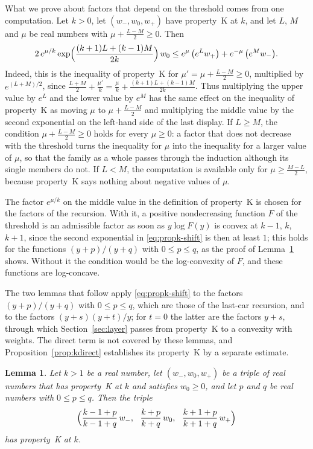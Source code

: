 \documentclass{amsart}
\newtheorem{lemma}[theorem]{Lemma}
\theoremstyle{definition}
\theoremstyle{remark}
\numberwithin{equation}{section}
\begin{document}
What we prove about factors that depend on the threshold comes from one computation. Let $k>0$, let $(w_-,w_0,w_+)$ have property~K at $k$, and let $L$, $M$ and $\mu$ be real numbers with $\mu+\frac{L-M}{2}\ge 0$. Then
\begin{equation}\label{eq:propk-shift}
2\,e^{\mu/k}\exp\Bigl(\frac{(k+1)L+(k-1)M}{2k}\Bigr)\,w_0\le e^{\mu}\,\bigl(e^{L}w_+\bigr)+e^{-\mu}\,\bigl(e^{M}w_-\bigr).
\end{equation}
Indeed, this is the inequality of property~K for $\mu'=\mu+\frac{L-M}{2}\ge 0$, multiplied by $e^{(L+M)/2}$, since $\frac{L+M}{2}+\frac{\mu'}{k}=\frac{\mu}{k}+\frac{(k+1)L+(k-1)M}{2k}$. Thus multiplying the upper value by $e^{L}$ and the lower value by $e^{M}$ has the same effect on the inequality of property~K as moving $\mu$ to $\mu+\frac{L-M}{2}$ and multiplying the middle value by the second exponential on the left-hand side of the last display. If $L\ge M$, the condition $\mu+\frac{L-M}{2}\ge 0$ holds for every $\mu\ge 0$: a factor that does not decrease with the threshold turns the inequality for $\mu$ into the inequality for a larger value of $\mu$, so that the family as a whole passes through the induction although its single members do not. If $L<M$, the computation is available only for $\mu\ge\frac{M-L}{2}$, because property~K says nothing about negative values of $\mu$.

The factor $e^{\mu/k}$ on the middle value in the definition of property~K is chosen for the factors of the recursion. With it, a positive nondecreasing function $F$ of the threshold is an admissible factor as soon as $y\log F(y)$ is convex at $k-1$, $k$, $k+1$, since the second exponential in \eqref{eq:propk-shift} is then at least $1$; this holds for the functions $(y+p)/(y+q)$ with $0\le p\le q$, as the proof of Lemma~\ref{lem:kratio} shows. Without it the condition would be the log-convexity of $F$, and these functions are log-concave.

The two lemmas that follow apply \eqref{eq:propk-shift} to the factors $(y+p)/(y+q)$ with $0\le p\le q$, which are those of the last-car recursion, and to the factors $(y+s)(y+t)/y$; for $t=0$ the latter are the factors $y+s$, through which Section~\ref{sec:layer} passes from property~K to a convexity with weights. The direct term is not covered by these lemmas, and Proposition~\ref{prop:kdirect} establishes its property~K by a separate estimate.

\begin{lemma}\label{lem:kratio}
Let $k>1$ be a real number, let $(w_-,w_0,w_+)$ be a triple of real numbers that has property~K at $k$ and satisfies $w_0\ge 0$, and let $p$ and $q$ be real numbers with $0\le p\le q$. Then the triple
\[
\Bigl(\frac{k-1+p}{k-1+q}\,w_-,\ \ \frac{k+p}{k+q}\,w_0,\ \ \frac{k+1+p}{k+1+q}\,w_+\Bigr)
\]
has property~K at $k$.
\end{lemma}
\end{document}
